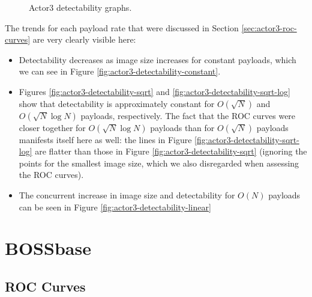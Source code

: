 \documentclass[11pt,a4paper,twoside,openright]{report}
\begin{document}
\begin{figure}[htbp]
    \caption{Actor3 detectability graphs.}
    \label{fig:actor3-detectability-graphs}
\end{figure}

The trends for each payload rate that were discussed in Section \ref{sec:actor3-roc-curves} are very clearly visible here:
\begin{itemize}
	\item Detectability decreases as image size increases for constant payloads, which we can see in Figure \ref{fig:actor3-detectability-constant}.
	\item Figures \ref{fig:actor3-detectability-sqrt} and \ref{fig:actor3-detectability-sqrt-log} show that detectability is approximately constant for $O(\sqrt{N})$ and $O(\sqrt{N} \log{N})$ payloads, respectively. The fact that the ROC curves were closer together for $O(\sqrt{N} \log{N})$ payloads than for $O(\sqrt{N})$ payloads manifests itself here as well: the lines in Figure \ref{fig:actor3-detectability-sqrt-log} are flatter than those in Figure \ref{fig:actor3-detectability-sqrt} (ignoring the points for the smallest image size, which we also disregarded when assessing the ROC curves).
	\item The concurrent increase in image size and detectability for $O(N)$ payloads can be seen in Figure \ref{fig:actor3-detectability-linear}
\end{itemize}


\section{BOSSbase} \label{sec:bossbase-results}

\subsection{ROC Curves} \label{sec:bossbase-roc-curves}
\end{document}
